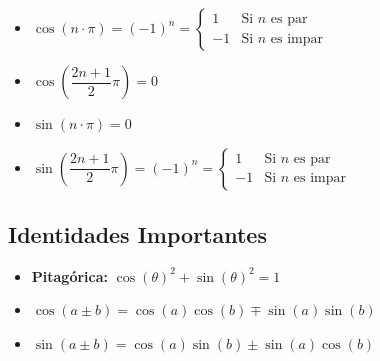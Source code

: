 \documentclass[12pt, fleqn]{report}                             %
\newcommand{\Wrap}[1]{\left( #1 \right)}                        %
\newcommand{\Cos}[1]{\cos\Wrap{#1}}                             %
\newcommand{\Sin}[1]{\sin\Wrap{#1}}                             %
\begin{document}
                \begin{itemize}
                    \item
                        $
                            \Cos{n \cdot \pi} 
                            =
                            (-1)^n  
                            =
                            \begin{cases}
                                1 & \text{Si $n$ es par}      \\
                                -1 & \text{Si $n$ es impar}
                            \end{cases} 
                        $                        

                    \item $\Cos{\dfrac{2n+1}{2} \pi } = 0$

                    \item $\Sin{n \cdot \pi} = 0$

                    \item
                        $
                            \Sin{\dfrac{2n+1}{2} \pi }
                            =
                            (-1)^n  
                            =
                            \begin{cases}
                                1 & \text{Si $n$ es par}      \\
                                -1 & \text{Si $n$ es impar}
                            \end{cases}
                        $
                \end{itemize}




            \subsection{Identidades Importantes}

                \begin{itemize}
                    \item
                        \textbf{Pitagórica: } $\Cos{\theta}^2 + \Sin{\theta}^2 = 1$

                    \item 
                        $\Cos{a \pm b } = \Cos{a}\Cos{b} \mp \Sin{a}\Sin{b}$

                    \item
                        $\Sin{a \pm b } = \Cos{a}\Sin{b} \pm \Sin{a}\Cos{b}$

                \end{itemize}
\end{document}
